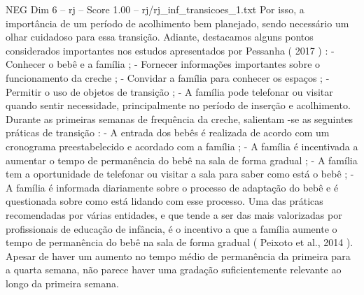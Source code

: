 \begin{textsample}{NEG Dim 6 – rj – Score 1.00 – rj/rj\_inf\_transicoes\_1.txt}
Por isso, a importância de um período de acolhimento bem planejado, sendo necessário um olhar cuidadoso para essa transição.
Adiante, destacamos alguns pontos considerados importantes nos estudos apresentados por Pessanha ( 2017 ) : - Conhecer o bebê e a família ; - Fornecer informações importantes sobre o funcionamento da creche ; - Convidar a família para conhecer os espaços ; - Permitir o uso de objetos de transição ; - A família pode telefonar ou visitar quando sentir necessidade, principalmente no período de inserção e acolhimento.
Durante as primeiras semanas de frequência da creche, salientam -se as seguintes práticas de transição : - A entrada dos bebês é realizada de acordo com um cronograma preestabelecido e acordado com a família ; - A família é incentivada a aumentar o tempo de permanência do bebê na sala de forma gradual ; - A família tem a oportunidade de telefonar ou visitar a sala para saber como está o bebê ; - A família é informada diariamente sobre o processo de adaptação do bebê e é questionada sobre como está lidando com esse processo.
Uma das práticas recomendadas por várias entidades, e que tende a ser das mais valorizadas por profissionais de educação de infância, é o incentivo a que a família aumente o tempo de permanência do bebê na sala de forma gradual ( Peixoto et al., 2014 ).
Apesar de haver um aumento no tempo médio de permanência da primeira para a quarta semana, não parece haver uma gradação suficientemente relevante ao longo da primeira semana.

\end{textsample}
